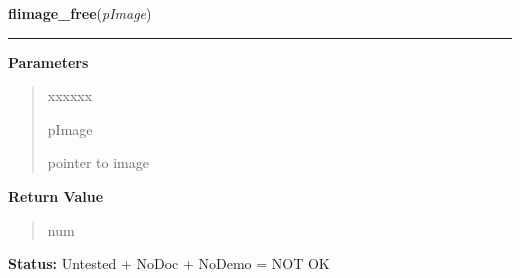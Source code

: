 \hspace{.8\funcindent}\begin{boxedminipage}{\funcwidth}

    \raggedright \textbf{flimage\_free}(\textit{pImage})

    \vspace{-1.5ex}

    \rule{\textwidth}{0.5\fboxrule}
\setlength{\parskip}{2ex}
\setlength{\parskip}{1ex}
      \textbf{Parameters}
      \vspace{-1ex}

      \begin{quote}
        \begin{Ventry}{xxxxxx}

          \item[pImage]

          pointer to image

        \end{Ventry}

      \end{quote}

      \textbf{Return Value}
    \vspace{-1ex}

      \begin{quote}
      num

      \end{quote}

\textbf{Status:} Untested + NoDoc + NoDemo = NOT OK



    \end{boxedminipage}

    \label{xformslib:library:flimage_display}

    \vspace{0.5ex}

